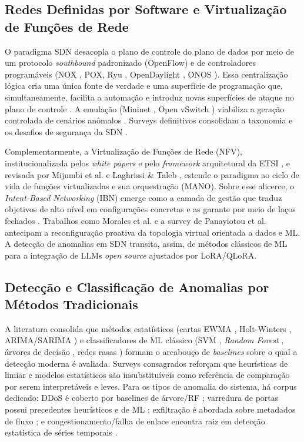 \documentclass[12pt,a4paper]{article}
\begin{document}
\subsection{Redes Definidas por Software e Virtualização de Funções de Rede}
\label{sec:sdn}

O paradigma SDN desacopla o plano de controle do plano de dados por meio de um
protocolo \textit{southbound} padronizado (OpenFlow) \cite{rA11} e de controladores
programáveis (NOX \cite{rA12}, POX, Ryu \cite{rA116}, OpenDaylight \cite{rA114}, ONOS \cite{rA115}).
Essa centralização lógica cria uma única fonte de verdade e uma superfície de
programação que, simultaneamente, facilita a automação e introduz novas
superfícies de ataque no plano de controle \cite{rA122}\cite{rA123}\cite{rA124}. A emulação
(Mininet \cite{rA14}, Open vSwitch \cite{rA15}) viabiliza a geração controlada de cenários
anômalos \cite{rA19}. Surveys definitivos consolidam a taxonomia e os desafios de
segurança da SDN \cite{rA19}\cite{rA110}.

Complementarmente, a Virtualização de Funções de Rede (NFV), institucionalizada
pelos \textit{white papers} e pelo \textit{framework} arquitetural da ETSI
\cite{rA127}\cite{rA128}\cite{rA129}, e revisada por Mijumbi et al. \cite{rA130}\cite{rA131} e Laghrissi \&
Taleb \cite{rA132}, estende o paradigma ao ciclo de vida de funções virtualizadas e
sua orquestração (MANO). Sobre esse alicerce, o \textit{Intent-Based
Networking} (IBN) emerge como a camada de gestão que traduz objetivos de alto
nível em configurações concretas e as garante por meio de laços fechados
\cite{rA133}. Trabalhos como Morales et al. \cite{rA134} e a survey de Panayiotou et al.
\cite{rA135} antecipam a reconfiguração proativa da topologia virtual orientada a
dados e ML. A detecção de anomalias em SDN transita, assim, de métodos
clássicos de ML \cite{rA126} para a integração de LLMs \textit{open source}
ajustados por LoRA/QLoRA.

\subsection{Detecção e Classificação de Anomalias por Métodos Tradicionais}
\label{sec:ml}

A literatura consolida que métodos estatísticos (cartas EWMA \cite{rA22}, Holt-Winters
\cite{rA21}, ARIMA/SARIMA \cite{rA25}\cite{rA26}\cite{rA27}) e classificadores de ML clássico (SVM
\cite{rA213}, \textit{Random Forest} \cite{rA210}, árvores de decisão \cite{rA217}, redes
rasas \cite{rA231}) formam o arcabouço de \textit{baselines} sobre o qual a detecção
moderna é avaliada. Surveys consagrados \cite{rA28}\cite{rA29}\cite{rA210}\cite{rA212} reforçam que
heurísticas de limiar e modelos estatísticos são insubstituíveis como
referência de comparação por serem interpretáveis e leves. Para os tipos de
anomalia do sistema, há corpus dedicado: DDoS é coberto por baselines de
árvore/RF \cite{rA222}\cite{rA224}\cite{rA225}; varredura de portas possui precedentes
heurísticos e de ML \cite{rA227}\cite{rA229}\cite{rA230}; exfiltração é abordada sobre metadados
de fluxo \cite{rA226}; e congestionamento/falha de enlace encontra raiz em detecção
estatística de séries temporais \cite{rA21}\cite{rA232}\cite{rA21}.
\end{document}
